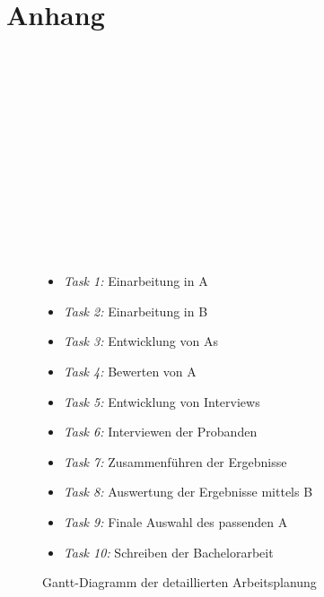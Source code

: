 \chapter{Anhang}\label{ch:anhang}
\begin{figure}[H]
    \begin{ganttchart}{1}{15}
         \\
         \\
         \\
         \\
         \\
         \\
         \\
         \\
         \\
         \\
         \\
         \\
        \label{fig:gantchart}
    \end{ganttchart}
    \caption{Gantt-Diagramm der detaillierten Arbeitsplanung}
    \begin{itemize}
        \item \textit{Task 1:} Einarbeitung in A
        \item \textit{Task 2:} Einarbeitung in B
        \item \textit{Task 3:} Entwicklung von As
        \item \textit{Task 4:} Bewerten von A
        \item \textit{Task 5:} Entwicklung von Interviews
        \item \textit{Task 6:} Interviewen der Probanden
        \item \textit{Task 7:} Zusammenführen der Ergebnisse
        \item \textit{Task 8:} Auswertung der Ergebnisse mittels B
        \item \textit{Task 9:} Finale Auswahl des passenden A
        \item \textit{Task 10:} Schreiben der Bachelorarbeit
    \end{itemize}
\end{figure}
